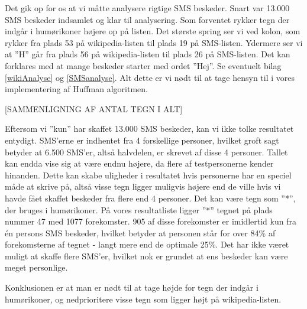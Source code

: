 Det gik op for os at vi måtte analysere rigtige SMS beskeder. Snart var 13.000 SMS beskeder indsamlet og klar til analysering. Som forventet rykker tegn der indgår i humørikoner højere op på listen. Det største spring ser vi ved kolon, som rykker fra plads 53 på wikipedia-listen til plads 19 på SMS-listen. Ydermere ser vi at ”H” går fra plads 56 på wikipedia-listen til plads 26 på SMS-listen. Det kan forklares med at mange beskeder starter med ordet ”Hej”. Se eventuelt bilag \ref{wikiAnalyse} og \ref{SMSanalyse}. Alt dette er vi nødt til at tage hensyn til i vores implementering af Huffman algoritmen.

[SAMMENLIGNING AF ANTAL TEGN I ALT]

Eftersom vi  ”kun” har skaffet 13.000 SMS beskeder, kan vi ikke tolke resultatet entydigt. SMS’erne er indhentet fra 4 forskellige personer, hvilket groft sagt betyder at 6.500 SMS’er, altså halvdelen, er skrevet af disse 4 personer. Tallet kan endda vise sig at være endnu højere, da flere af testpersonerne kender hinanden. Dette kan skabe uligheder i resultatet hvis personerne har en speciel måde at skrive på, altså visse tegn ligger muligvis højere end de ville hvis vi havde fået skaffet beskeder fra flere end 4 personer. Det kan være tegn som ”*”, der bruges i humørikoner. På vores resultatliste ligger ”*” tegnet på plads nummer 47 med 1077 forekomster. 905 af disse forekomster er imidlertid kun fra én persons SMS beskeder, hvilket betyder at personen står for over 84\% af forekomsterne af tegnet - langt mere end de optimale 25\%. Det har ikke været muligt at skaffe flere SMS’er, hvilket nok er grundet at ens beskeder kan være meget personlige.

Konklusionen er at man er nødt til at tage højde for tegn der indgår i humørikoner, og nedprioritere visse tegn som ligger højt på wikipedia-listen.
  